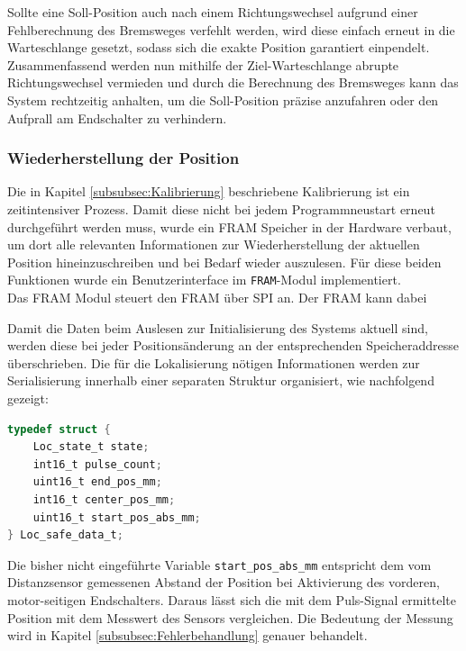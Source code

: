 \noindent
Sollte eine Soll-Position auch nach einem Richtungswechsel aufgrund einer Fehlberechnung des Bremsweges verfehlt werden, wird diese einfach erneut in die Warteschlange gesetzt, sodass sich die exakte Position garantiert einpendelt. Zusammenfassend werden nun mithilfe der Ziel-Warteschlange abrupte Richtungswechsel vermieden und durch die Berechnung des Bremsweges kann das System rechtzeitig anhalten, um die Soll-Position präzise anzufahren oder den Aufprall am Endschalter zu verhindern.
\subsubsection{Wiederherstellung der Position}
Die in Kapitel \ref{subsubsec:Kalibrierung} beschriebene Kalibrierung ist ein zeitintensiver Prozess. Damit diese nicht bei jedem Programmneustart erneut durchgeführt werden muss, wurde ein FRAM Speicher in der Hardware verbaut, um dort alle relevanten Informationen zur Wiederherstellung der aktuellen Position hineinzuschreiben und bei Bedarf wieder auszulesen. Für diese beiden Funktionen wurde ein Benutzerinterface im \verb|FRAM|-Modul implementiert.\\

\noindent
Das \ac{FRAM} Modul steuert den \ac{FRAM} über \ac{SPI} an. Der FRAM kann dabei 

\noindent
Damit die Daten beim Auslesen zur Initialisierung des Systems aktuell sind, werden diese bei jeder Positionsänderung an der entsprechenden Speicheraddresse überschrieben. Die für die Lokalisierung nötigen Informationen werden zur Serialisierung innerhalb einer separaten Struktur organisiert, wie nachfolgend gezeigt:
\begin{lstlisting}[language=C, caption={Speicherformat der Positionsdaten}, label={lst:locSafeData}]
typedef struct {
	Loc_state_t state;
	int16_t pulse_count;
	uint16_t end_pos_mm;
	int16_t center_pos_mm;
	uint16_t start_pos_abs_mm;
} Loc_safe_data_t;
\end{lstlisting}
Die bisher nicht eingeführte Variable \verb|start_pos_abs_mm| entspricht dem vom Distanzsensor gemessenen Abstand der Position bei Aktivierung des vorderen, motor-seitigen Endschalters. Daraus lässt sich die mit dem Puls-Signal ermittelte Position mit dem Messwert des Sensors vergleichen. Die Bedeutung der Messung wird in Kapitel \ref{subsubsec:Fehlerbehandlung} genauer behandelt. \\

